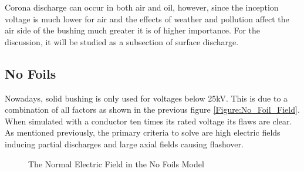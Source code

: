 Corona discharge can occur in both air and oil, however, since the inception voltage is much lower for air and the effects of weather and pollution affect the air side of the bushing much greater it is of higher importance. For the discussion, it will be studied as a subsection of surface discharge.  

\subsection{No Foils}
Nowadays, solid bushing is only used for voltages below 25kV. This is due to a combination of all factors as shown in the previous figure \ref{Figure:No_Foil_Field}. When simulated with a conductor ten times its rated voltage its flaws are clear. As mentioned previously, the primary criteria to solve are high electric fields inducing partial discharges and large axial fields causing flashover. 


\begin{figure}[!ht]
  \centering
{} 
\caption{The Normal Electric Field in the No Foils Model}
\label{Figure:Radial_No_Foils_Fails}
\end{figure}

